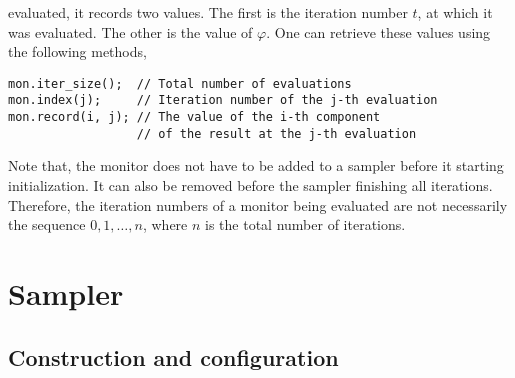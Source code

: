 evaluated, it records two values. The first is the iteration number $t$, at
which it was evaluated. The other is the value of $\varphi$. One can retrieve
these values using the following methods,
\begin{verbatim}
mon.iter_size();  // Total number of evaluations
mon.index(j);     // Iteration number of the j-th evaluation
mon.record(i, j); // The value of the i-th component
                  // of the result at the j-th evaluation
\end{verbatim}
Note that, the monitor does not have to be added to a sampler before it
starting initialization. It can also be removed before the sampler finishing
all iterations. Therefore, the iteration numbers of a monitor being evaluated
are not necessarily the sequence $0,1,\dots,n$, where $n$ is the total number
of iterations.

\section{Sampler}
\label{sec:Sampler}

\subsection{Construction and configuration}
\label{sec:Construction and configuration}

